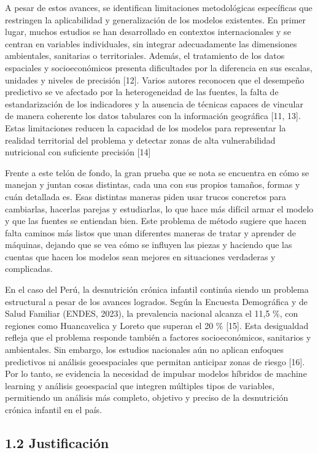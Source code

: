 \documentclass[
]{report}
\begin{document}
A pesar de estos avances, se identifican limitaciones metodológicas
específicas que restringen la aplicabilidad y generalización de los
modelos existentes. En primer lugar, muchos estudios se han desarrollado
en contextos internacionales y se centran en variables individuales, sin
integrar adecuadamente las dimensiones ambientales, sanitarias o
territoriales. Además, el tratamiento de los datos espaciales y
socioeconómicos presenta dificultades por la diferencia en sus escalas,
unidades y niveles de precisión {[}12{]}. Varios autores reconocen que
el desempeño predictivo se ve afectado por la heterogeneidad de las
fuentes, la falta de estandarización de los indicadores y la ausencia de
técnicas capaces de vincular de manera coherente los datos tabulares con
la información geográfica {[}11, 13{]}. Estas limitaciones reducen
la capacidad de los modelos para representar la realidad territorial del
problema y detectar zonas de alta vulnerabilidad nutricional con
suficiente precisión {[}14{]}

Frente a este telón de fondo, la gran prueba que se nota se encuentra en
cómo se manejan y juntan cosas distintas, cada una con sus propios
tamaños, formas y cuán detallada es. Esas distintas maneras piden usar
trucos concretos para cambiarlas, hacerlas parejas y estudiarlas, lo que
hace más difícil armar el modelo y que las fuentes se entiendan bien.
Este problema de método sugiere que hacen falta caminos más listos que
unan diferentes maneras de tratar y aprender de máquinas, dejando que se
vea cómo se influyen las piezas y haciendo que las cuentas que hacen los
modelos sean mejores en situaciones verdaderas y complicadas.

En el caso del Perú, la desnutrición crónica infantil continúa siendo un
problema estructural a pesar de los avances logrados. Según la Encuesta
Demográfica y de Salud Familiar (ENDES, 2023), la prevalencia nacional
alcanza el 11,5 \%, con regiones como Huancavelica y Loreto que superan
el 20 \% {[}15{]}. Esta desigualdad refleja que el problema responde
también a factores socioeconómicos, sanitarios y ambientales. Sin
embargo, los estudios nacionales aún no aplican enfoques predictivos ni
análisis geoespaciales que permitan anticipar zonas de riesgo {[}16{]}.
Por lo tanto, se evidencia la necesidad de impulsar modelos híbridos de
machine learning y análisis geoespacial que integren múltiples tipos de
variables, permitiendo un análisis más completo, objetivo y preciso de
la desnutrición crónica infantil en el país.

\hypertarget{justificaciuxf3n}{%
\subsection{1.2 Justificación}\label{justificaciuxf3n}}
\end{document}
